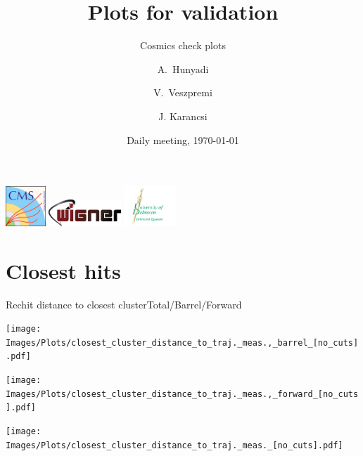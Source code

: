 \documentclass{beamer}
\title{Plots for validation}
\subtitle{Cosmics check plots}
\author{A.~Hunyadi\inst{1,2} \and V.~Veszpremi\inst{1} \and J. Karancsi\inst{2}}
\institute[] %
{
  \inst{1}%
  Wigner Research Centre for Physics, Budapest
  \and
  \inst{2}%
  University of Debrecen, Debrecen
}
\date{Daily meeting, \today}
\begin{document}
\begin{frame}
  \vspace*{-0.3cm}
  \titlepage
  \vspace*{-0.5cm}
  \begin{center}
  \includegraphics[height=1.5cm]{Images/cms_logo.png}\hspace*{0.3cm}
  \includegraphics[height=1.0cm]{Images/wigner_logo.png}\hspace*{0.4cm}
  \includegraphics[height=1.5cm]{Images/egyetem_logo.png}
  \end{center}
\end{frame}

\section{Closest hits}

\begin{frame}{Rechit distance to closest cluster}{Total/Barrel/Forward}
  \begin{minipage}{0.32\textwidth}
    \centering
    \texttt{[image: Images/Plots/closest\_cluster\_distance\_to\_traj.\_meas.,\_barrel\_[no\_cuts].pdf]}
  \end{minipage}%
  \hspace{0.01\textwidth}%
  \begin{minipage}{0.32\textwidth}
    \centering
    \texttt{[image: Images/Plots/closest\_cluster\_distance\_to\_traj.\_meas.,\_forward\_[no\_cuts].pdf]}
  \end{minipage}%
  \hspace{0.01\textwidth}%
  \begin{minipage}{0.32\textwidth}
    \centering
    \texttt{[image: Images/Plots/closest\_cluster\_distance\_to\_traj.\_meas.\_[no\_cuts].pdf]}
  \end{minipage}
\end{frame}
\end{document}
